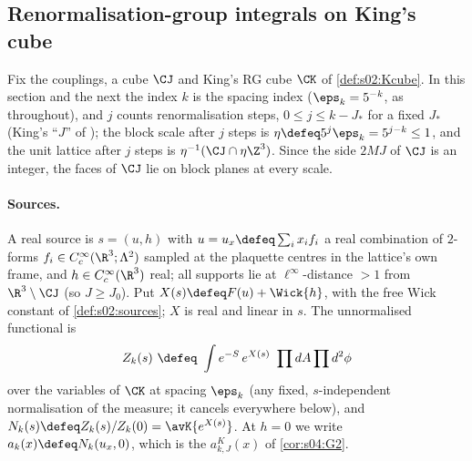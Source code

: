 \subsection{Renormalisation-group integrals on King's cube}\label{ssec:k01:setting}

Fix the couplings, a cube $\CJ$ and King's RG cube $\CK$ of \cref{def:s02:Kcube}. In this section and the next the index $k$ is the spacing index ($\eps_k=5^{-k}$, as throughout), and $j$ counts renormalisation steps, $0\le j\le k-J_*$ for a fixed $J_*$ (King's ``$J$'' of \cite[Thm.~3.1]{K1}); the block scale after $j$ steps is $\eta\defeq5^{j}\eps_k=5^{j-k}\le1$, and the unit lattice after $j$ steps is $\eta^{-1}(\CJ\cap\eta\Z^3)$. Since the side $2MJ$ of $\CJ$ is an integer, the faces of $\CJ$ lie on block planes at every scale.

\paragraph{Sources.} A real source is $s=(u,h)$ with $u=u_x\defeq\sum_ix_if_i$ a real combination of $2$-forms $f_i\in C^\infty_c(\R^3;\Lambda^2)$ sampled at the plaquette centres in the lattice's own frame, and $h\in C^\infty_c(\R^3)$ real; all supports lie at $\ell^\infty$-distance $>1$ from $\R^3\setminus\CJ$ (so $J\ge J_0$). Put $X(s)\defeq F(u)+\Wick{h}$, with the free Wick constant of \cref{def:s02:sources}; $X$ is real and linear in $s$. The unnormalised functional is
\[
\Zk(s)\ \defeq\ \int e^{-S}\,e^{X(s)}\ \prod dA\prod d^2\phi
\]
over the variables of $\CK$ at spacing $\eps_k$ (any fixed, $s$-independent normalisation of the measure; it cancels everywhere below), and $N_k(s)\defeq\Zk(s)/\Zk(0)=\avK{e^{X(s)}}$. At $h=0$ we write $a_k(x)\defeq N_k(u_x,0)$, which is the $a^K_{k,J}(x)$ of \cref{cor:s04:G2}.

